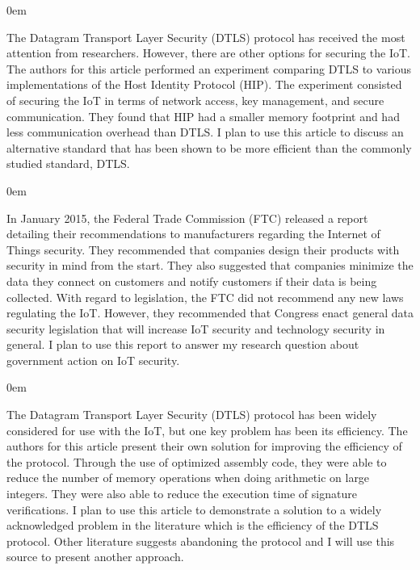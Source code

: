 \documentclass{article}
\newenvironment{annotation}{\begin{addmargin}[2.5em]{0em} \begin{flushleft}}{\end{flushleft} \end{addmargin}}
\begin{document}
\begin{annotation}
The Datagram Transport Layer Security (DTLS) protocol has received the most attention from researchers. However, there are other options for securing the IoT. The authors for this article performed an 
experiment comparing DTLS to various implementations of the Host Identity Protocol (HIP). The experiment consisted of securing the IoT in terms of network access, key management, and secure communication.
They found that HIP had a smaller memory footprint and had less communication overhead than DTLS. I plan to use this article to discuss an alternative standard that has been shown to be more efficient
than the commonly studied standard, DTLS.
\end{annotation}

\begin{annotation}
In January 2015, the Federal Trade Commission (FTC) released a report detailing their recommendations to manufacturers regarding the Internet of Things security. They recommended that companies design their
products with security in mind from the start. They also suggested that companies minimize the data they connect on customers and notify customers if their data is being collected. With regard to 
legislation, the FTC did not recommend any new laws regulating the IoT. However, they recommended that Congress enact general data security legislation that will increase IoT security and technology 
security in general. I plan to use this report to answer my research question about government action on IoT security.
\end{annotation}

\newpage
{}
\begin{annotation}
The Datagram Transport Layer Security (DTLS) protocol has been widely considered for use with the IoT, but one key problem has been its efficiency. The authors for this article present their
own solution for improving the efficiency of the protocol. Through the use of optimized assembly code, they were able to reduce the number of memory operations when doing arithmetic on large
integers. They were also able to reduce the execution time of signature verifications. I plan to use this article to demonstrate a solution to a widely acknowledged problem in the literature which
is the efficiency of the DTLS protocol. Other literature suggests abandoning the protocol and I will use this source to present another approach. 
\end{annotation}
\end{document}
